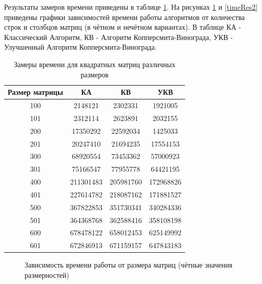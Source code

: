 \documentclass[12pt]{report}
\begin{document}
Результаты замеров времени приведены в таблице \ref{time}. На рисунках \ref{timeRes1} и \ref{timeRes2} приведены графики зависимостей времени работы алгоритмов от количества строк и столбцов матриц (в чётном и нечётном вариантах). В таблице КА - Классический Алгоритм, КВ - Алгоритм Копперсмита-Винограда, УКВ - Улучшенный Алгоритм Копперсмита-Винограда.

\newpage
\begin{table}[h]
	\begin{center}
		\caption{\label{time} Замеры времени для квадратных матриц различных размеров}
		\begin{tabular}{|c c c c|} 
 			\hline
			Размер матрицы & КА & КВ & УКВ \\ [0.5ex] 
 			\hline\hline
 			100 & 2148121& 2302331& 1921005\\
 			\hline
 			101 & 2312114& 2623891& 2032155\\
 			\hline
			200 & 17350292& 22592034& 1425033\\
			\hline
			201 & 20247410& 21694235& 17554153\\
			\hline
			300 & 68920554&  73453362& 57000923\\
			\hline
			301 &  75166547&  77955778& 64421195\\
			\hline
			400 &  211301483&  205981760& 172968826\\
			\hline
			401 &  227614782&  218087162& 171881527\\
			\hline
			500 &  367822853&  351730341& 340284336\\
			\hline
			501 &  364368768&  362588416& 358108198\\
			\hline
			600 &  678478122&  	658012453& 625149992\\
			\hline
			601 &  672846913&  671159157& 647843183\\
			\hline
			\end{tabular}
	\end{center}
\end{table}

\begin{figure}[h]
\begin{center}
	\captionsetup{justification=centering}
	\caption{Зависимость времени работы от размера матриц (чётные значения размерностей)}
	\label{timeRes1}
	\end{center}
\end{figure}
\end{document}

